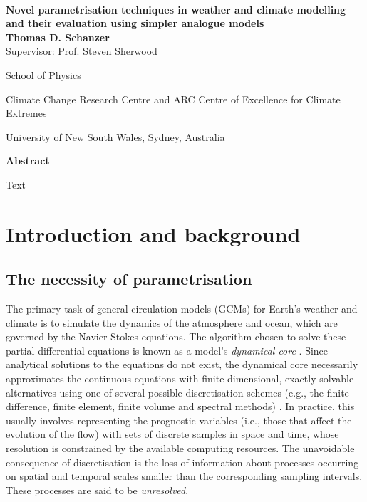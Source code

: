 \documentclass[titlepage,twoside]{article}
\numberwithin{equation}{section}
\begin{document}
\begin{titlepage}
\vfill~

\begin{center}
    {\Huge \textbf{%
        Novel parametrisation techniques in weather and climate modelling and
        their evaluation using simpler analogue models
    }} \\
    \vspace{0.75cm}
    {\Large\textbf{Thomas D. Schanzer}} \\
    \vspace{6pt}
    {\large Supervisor: Prof. Steven Sherwood} \\
    \vspace{0.75cm}
    {\large%
        School of Physics

        Climate Change Research Centre and
        ARC Centre of Excellence for Climate Extremes

        University of New South Wales, Sydney, Australia
    }
\end{center}
\vfill
\begin{center}
{\large\textbf{Abstract}}

\begin{minipage}{13cm}
    Text
\end{minipage}
\end{center}
\vfill
\end{titlepage}

\clearpage
\tableofcontents

\clearpage
\pagestyle{fancy}
\thispagestyle{fancy}

\section{Introduction and background} \label{sec:intro}
\subsection{The necessity of parametrisation}
The primary task of general circulation models (GCMs) for Earth's weather and
climate is to simulate the dynamics of the atmosphere and ocean, which are
governed by the Navier-Stokes equations. The algorithm chosen to solve these
partial differential equations is known as a model's \emph{dynamical core}
\parencite{mcfarlane2011}. Since analytical solutions to the equations do not
exist, the dynamical core necessarily approximates the continuous equations
with finite-dimensional, exactly solvable alternatives using one of several
possible discretisation schemes (e.g., the finite difference, finite element,
finite volume and spectral methods) \parencite{christensen2022}. In practice,
this usually involves representing the prognostic variables (i.e., those that
affect the evolution of the flow) with sets of discrete samples in space and
time, whose resolution is constrained by the available computing resources. The
unavoidable consequence of discretisation is the loss of information about
processes occurring on spatial and temporal scales smaller than the
corresponding sampling intervals. These processes are said to be
\emph{unresolved}.
\end{document}
